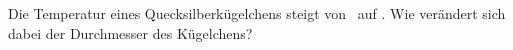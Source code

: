 Die Temperatur eines Quecksilberkügelchens steigt von \TAqO\ auf \TBqO. Wie verändert sich dabei der Durchmesser des Kügelchens?
